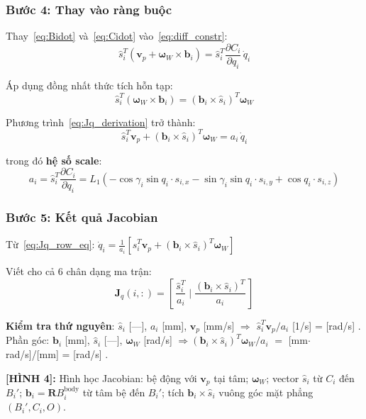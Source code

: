 \documentclass[12pt,a4paper]{article}
\newcommand{\figref}[2]{%
  \begin{mdframed}[
    linecolor=blue!50, linewidth=1pt,
    backgroundcolor=blue!3,
    innerleftmargin=6pt, innerrightmargin=6pt,
    innertopmargin=4pt, innerbottommargin=4pt
  ]
  {\small\bfseries [H\`{I}NH #1]:} {\small #2}
  \end{mdframed}
}
\newcommand{\Jq}{\mathbf{J}_q}
\newcommand{\wv}{\boldsymbol{\omega}}
\newcommand{\shat}{\hat{s}}
\newcommand{\bvec}{\mathbf{b}}
\newcommand{\vp}{\mathbf{v}_p}
\begin{document}
\subsubsection{Bước 4: Thay vào ràng buộc}

Thay~\eqref{eq:Bidot} và~\eqref{eq:Cidot} vào~\eqref{eq:diff_constr}:
\begin{equation}
  \shat_i^T(\vp + \wv_W\times\bvec_i) = \shat_i^T\frac{\partial C_i}{\partial q_i}\,\dot q_i
  \label{eq:Jq_derivation}
\end{equation}

Áp dụng đồng nhất thức tích hỗn tạp:
\begin{equation}
  \shat_i^T(\wv_W\times\bvec_i)
  = (\bvec_i\times\shat_i)^T\wv_W
\end{equation}

Phương trình~\eqref{eq:Jq_derivation} trở thành:
\begin{equation}
  \shat_i^T\vp + (\bvec_i\times\shat_i)^T\wv_W = a_i\,\dot q_i
  \label{eq:Jq_row_eq}
\end{equation}

trong đó \textbf{hệ số scale}:
\begin{equation}
  a_i = \shat_i^T\frac{\partial C_i}{\partial q_i}
  = L_1\left(-\cos\gamma_i\sin q_i\cdot s_{i,x} - \sin\gamma_i\sin q_i\cdot s_{i,y} + \cos q_i\cdot s_{i,z}\right)
  \label{eq:ai}
\end{equation}

\subsubsection{Bước 5: Kết quả Jacobian}

Từ~\eqref{eq:Jq_row_eq}: $\dot q_i = \frac{1}{a_i}[\shat_i^T\vp + (\bvec_i\times\shat_i)^T\wv_W]$

Viết cho cả 6 chân dạng ma trận:
\begin{equation}
  \boxed{
    \Jq(i,:) = \left[\,\frac{\shat_i^T}{a_i}\;\bigg|\;\frac{(\bvec_i\times\shat_i)^T}{a_i}\,\right]
  }
  \label{eq:Jq_row}
\end{equation}

\textbf{Kiểm tra thứ nguyên}: $\shat_i$ [---], $a_i$ [mm], $\vp$ [mm/s]
$\Rightarrow$ $\shat_i^T\vp/a_i$ [1/s] = [rad/s] \checkmark{}. Phần góc: $\bvec_i$ [mm],
$\shat_i$ [---], $\wv_W$ [rad/s] $\Rightarrow (\bvec_i\times\shat_i)^T\wv_W/a_i$
$=$ [mm$\cdot$rad/s]/[mm] = [rad/s] \checkmark{}.

\figref{4}{Hình học Jacobian: bệ động với $\vp$ tại tâm; $\wv_W$; vector $\shat_i$
từ $C_i$ đến $B_i'$; $\bvec_i = \mathbf{R}B_i^{\text{body}}$ từ tâm bệ đến $B_i'$;
tích $\bvec_i\times\shat_i$ vuông góc mặt phẳng $(B_i'{,} C_i{,} O)$.}
\end{document}
